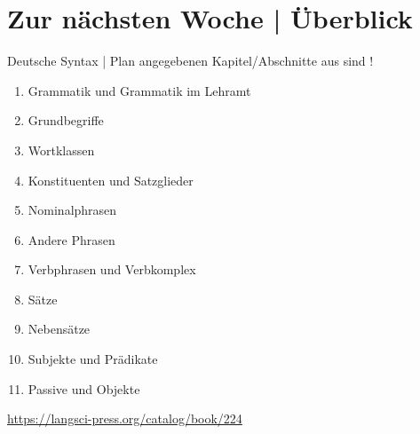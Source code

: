 \ifdefined\TITLE
  \section{Zur nächsten Woche | Überblick}

  \begin{frame}
    {Deutsche Syntax | Plan}
     angegebenen Kapitel\slash Abschnitte aus  sind !\\
    \Halbzeile
    \begin{enumerate}
      \item Grammatik und Grammatik im Lehramt 
      \item Grundbegriffe 
      \item Wortklassen 
      \item Konstituenten und Satzglieder 
      \item \alert{Nominalphrasen} 
      \item Andere Phrasen 
      \item Verbphrasen und Verbkomplex 
      \item Sätze  
      \item Nebensätze 
      \item Subjekte und Prädikate 
      \item Passive und Objekte 
    \end{enumerate}
    \Halbzeile
    \centering 
    \url{https://langsci-press.org/catalog/book/224}
  \end{frame}
\fi



